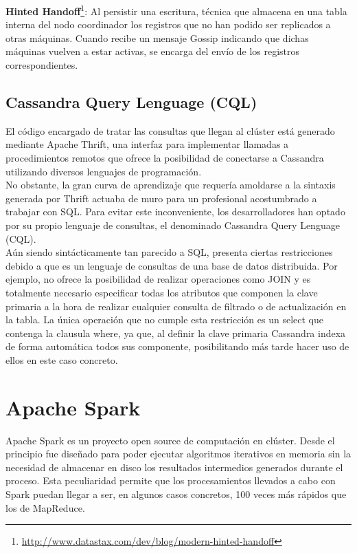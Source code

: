 \textbf{Hinted Handoff}\footnote{\url{http://www.datastax.com/dev/blog/modern-hinted-handoff}}: Al persistir una escritura, técnica que almacena en una tabla interna del nodo coordinador los registros que no han podido ser replicados a otras máquinas. Cuando recibe un mensaje Gossip indicando que dichas máquinas vuelven a estar activas, se encarga del envío de los registros correspondientes.\\

\subsection{Cassandra Query Lenguage (CQL)}

El código encargado de tratar las consultas que llegan al clúster está generado mediante Apache Thrift\cite{slee2007thrift}, una interfaz para implementar llamadas a procedimientos remotos\cite{nelson1981remote} que ofrece la posibilidad de conectarse a Cassandra utilizando diversos lenguajes de programación.\\

No obstante, la gran curva de aprendizaje que requería amoldarse a la sintaxis generada por Thrift actuaba de muro para un profesional acostumbrado a trabajar con SQL. Para evitar este inconveniente, los desarrolladores han optado por su propio lenguaje de consultas, el denominado Cassandra Query Lenguage (CQL).\\


Aún siendo sintácticamente  tan parecido a SQL, presenta ciertas restricciones debido a que es un lenguaje de consultas de una base de datos distribuida. Por ejemplo, no ofrece la posibilidad de realizar operaciones como JOIN y es totalmente necesario especificar todas los atributos que componen la clave primaria a la hora de realizar cualquier consulta de filtrado o de actualización en la tabla. La única operación que no cumple esta restricción es un select que contenga la clausula where, ya que, al definir la clave primaria Cassandra indexa de forma automática todos sus componente, posibilitando más tarde  hacer uso de ellos en este caso concreto.\\
  
\section{Apache Spark}

Apache Spark\cite{zaharia2010spark} es un proyecto open source de computación en clúster. Desde el principio fue diseñado para poder ejecutar algoritmos iterativos en memoria sin la necesidad de almacenar en disco los resultados intermedios generados durante el proceso. Esta peculiaridad permite que los procesamientos llevados a cabo con Spark puedan llegar a ser, en algunos casos concretos, 100 veces más rápidos que los de MapReduce\cite{dean2008mapreduce}.\\

